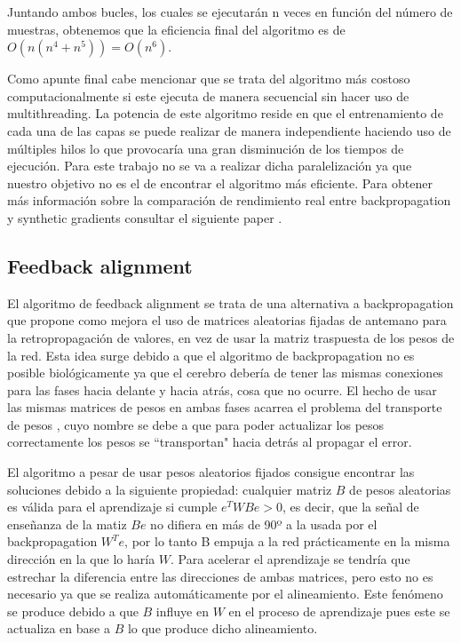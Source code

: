 Juntando ambos bucles, los cuales se ejecutarán n veces en función del número de muestras, obtenemos que la eficiencia final del algoritmo es de $O(n(n^4+n^5)) = O(n^6)$. 

Como apunte final cabe mencionar que se trata del algoritmo más costoso computacionalmente si este ejecuta de manera secuencial sin hacer uso de multithreading. La potencia de este algoritmo reside en que el entrenamiento de cada una de las capas se puede realizar de manera independiente haciendo uso de múltiples hilos lo que provocaría una gran disminución de los tiempos de ejecución. Para este trabajo no se va a realizar dicha paralelización ya que nuestro objetivo no es el de encontrar el algoritmo más eficiente. Para obtener más información sobre la comparación de rendimiento real entre backpropagation y synthetic gradients consultar el siguiente paper \cite{RefWorks:RefID:14-bisong2017benchmarking}.




\subsection{Feedback alignment}

El algoritmo de feedback alignment \cite{RefWorks:RefID:9-lillicrap2016random} se trata de una alternativa a backpropagation que propone como mejora el uso de matrices aleatorias fijadas de antemano para la retropropagación de valores, en vez de usar la matriz traspuesta de los pesos de la red. Esta idea surge debido a que el algoritmo de backpropagation no es posible biológicamente ya que el cerebro debería de tener las mismas conexiones para las fases hacia delante y hacia atrás, cosa que no ocurre. El hecho de usar las mismas matrices de pesos en ambas fases acarrea el problema del transporte de pesos \cite{RefWorks:RefID:10-grossberg1987competitive}, cuyo nombre se debe a que para poder actualizar los pesos correctamente los pesos se ``transportan" hacia detrás al propagar el error. 

El algoritmo a pesar de usar pesos aleatorios fijados consigue encontrar las soluciones debido a la siguiente propiedad: cualquier matriz $B$ de pesos aleatorias es válida para el aprendizaje si cumple $e^{T}WBe>0$, es decir, que la señal de enseñanza de la matiz $Be$ no difiera en más de 90º a la usada por el backpropagation $W^{T}e$, por lo tanto B empuja a la red prácticamente en la misma dirección en la que lo haría $W$. Para acelerar el aprendizaje se tendría que estrechar la diferencia entre las direcciones de ambas matrices, pero esto no es necesario ya que se realiza automáticamente por el alineamiento. Este fenómeno se produce debido a que $B$ influye en $W$ en el proceso de aprendizaje pues este se actualiza en base a $B$ lo que produce dicho alineamiento.

